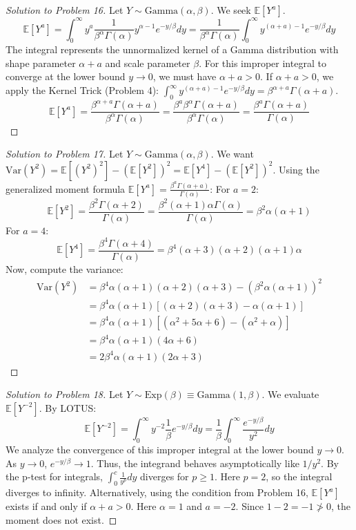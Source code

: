\documentclass[11pt, a4paper]{article}
\theoremstyle{definition}
\theoremstyle{remark}
\newcommand{\E}{\mathbb{E}}
\begin{document}
\begin{proof}[Solution to Problem 16]
Let $Y \sim \text{Gamma}(\alpha, \beta)$. We seek $\E[Y^a]$.
\[ \E[Y^a] = \int_0^\infty y^a \frac{1}{\beta^\alpha \Gamma(\alpha)} y^{\alpha-1} e^{-y/\beta} dy = \frac{1}{\beta^\alpha \Gamma(\alpha)} \int_0^\infty y^{(\alpha+a)-1} e^{-y/\beta} dy \]
The integral represents the unnormalized kernel of a Gamma distribution with shape parameter $\alpha + a$ and scale parameter $\beta$.
For this improper integral to converge at the lower bound $y \to 0$, we must have $\alpha + a > 0$.
If $\alpha + a > 0$, we apply the Kernel Trick (Problem 4): $\int_0^\infty y^{(\alpha+a)-1} e^{-y/\beta} dy = \beta^{\alpha+a} \Gamma(\alpha+a)$.
\[ \E[Y^a] = \frac{\beta^{\alpha+a} \Gamma(\alpha+a)}{\beta^\alpha \Gamma(\alpha)} = \frac{\beta^a \beta^\alpha \Gamma(\alpha+a)}{\beta^\alpha \Gamma(\alpha)} = \frac{\beta^a \Gamma(\alpha+a)}{\Gamma(\alpha)} \]
\end{proof}

\begin{proof}[Solution to Problem 17]
Let $Y \sim \text{Gamma}(\alpha, \beta)$. We want $\text{Var}(Y^2) = \E[(Y^2)^2] - (\E[Y^2])^2 = \E[Y^4] - (\E[Y^2])^2$.
Using the generalized moment formula $\E[Y^a] = \frac{\beta^a \Gamma(\alpha+a)}{\Gamma(\alpha)}$:
For $a=2$:
\[ \E[Y^2] = \frac{\beta^2 \Gamma(\alpha+2)}{\Gamma(\alpha)} = \frac{\beta^2 (\alpha+1)\alpha\Gamma(\alpha)}{\Gamma(\alpha)} = \beta^2 \alpha(\alpha+1) \]
For $a=4$:
\[ \E[Y^4] = \frac{\beta^4 \Gamma(\alpha+4)}{\Gamma(\alpha)} = \beta^4 (\alpha+3)(\alpha+2)(\alpha+1)\alpha \]
Now, compute the variance:
\begin{align*}
\text{Var}(Y^2) &= \beta^4 \alpha(\alpha+1)(\alpha+2)(\alpha+3) - \left( \beta^2 \alpha(\alpha+1) \right)^2 \\
&= \beta^4 \alpha(\alpha+1) \left[ (\alpha+2)(\alpha+3) - \alpha(\alpha+1) \right] \\
&= \beta^4 \alpha(\alpha+1) \left[ (\alpha^2 + 5\alpha + 6) - (\alpha^2 + \alpha) \right] \\
&= \beta^4 \alpha(\alpha+1)(4\alpha + 6) \\
&= 2\beta^4 \alpha(\alpha+1)(2\alpha + 3)
\end{align*}
\end{proof}

\begin{proof}[Solution to Problem 18]
Let $Y \sim \text{Exp}(\beta) \equiv \text{Gamma}(1, \beta)$. We evaluate $\E[Y^{-2}]$.
By LOTUS:
\[ \E[Y^{-2}] = \int_0^\infty y^{-2} \frac{1}{\beta} e^{-y/\beta} dy = \frac{1}{\beta} \int_0^\infty \frac{e^{-y/\beta}}{y^2} dy \]
We analyze the convergence of this improper integral at the lower bound $y \to 0$.
As $y \to 0$, $e^{-y/\beta} \to 1$. Thus, the integrand behaves asymptotically like $1/y^2$.
By the p-test for integrals, $\int_0^c \frac{1}{y^p} dy$ diverges for $p \ge 1$. Here $p=2$, so the integral diverges to infinity.
Alternatively, using the condition from Problem 16, $\E[Y^a]$ exists if and only if $\alpha + a > 0$. Here $\alpha = 1$ and $a = -2$. Since $1 - 2 = -1 \not> 0$, the moment does not exist.
\end{proof}
\end{document}

